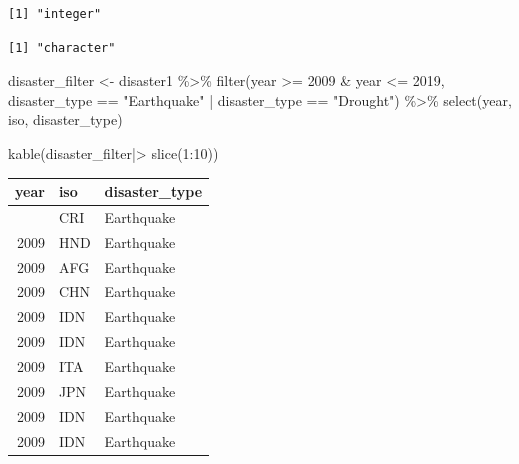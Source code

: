 \documentclass[
  letterpaper,
  DIV=11,
  numbers=noendperiod]{scrartcl}
\newenvironment{Shaded}{\begin{snugshade}}{\end{snugshade}}
\newcommand{\DecValTok}[1]{\textcolor[rgb]{0.68,0.00,0.00}{#1}}
\newcommand{\FunctionTok}[1]{\textcolor[rgb]{0.28,0.35,0.67}{#1}}
\newcommand{\NormalTok}[1]{\textcolor[rgb]{0.00,0.23,0.31}{#1}}
\newcommand{\OtherTok}[1]{\textcolor[rgb]{0.00,0.23,0.31}{#1}}
\newcommand{\SpecialCharTok}[1]{\textcolor[rgb]{0.37,0.37,0.37}{#1}}
\newcommand{\StringTok}[1]{\textcolor[rgb]{0.13,0.47,0.30}{#1}}
\newcounter{none} %
\begin{document}
\begin{verbatim}
[1] "integer"
\end{verbatim}

\begin{Shaded}
\end{Shaded}

\begin{verbatim}
[1] "character"
\end{verbatim}

\begin{Shaded}
\begin{Highlighting}[]
\NormalTok{disaster\_filter }\OtherTok{\textless{}{-}}\NormalTok{ disaster1 }\SpecialCharTok{\%\textgreater{}\%} \FunctionTok{filter}\NormalTok{(year }\SpecialCharTok{\textgreater{}=} \DecValTok{2009} \SpecialCharTok{\&}\NormalTok{ year }\SpecialCharTok{\textless{}=} \DecValTok{2019}\NormalTok{,}
\NormalTok{                                        disaster\_type }\SpecialCharTok{==} \StringTok{"Earthquake"} \SpecialCharTok{|} 
\NormalTok{                                            disaster\_type }\SpecialCharTok{==} \StringTok{"Drought"}\NormalTok{) }\SpecialCharTok{\%\textgreater{}\%} 
                    \FunctionTok{select}\NormalTok{(year, iso, disaster\_type)}

\FunctionTok{kable}\NormalTok{(disaster\_filter}\SpecialCharTok{|\textgreater{}} \FunctionTok{slice}\NormalTok{(}\DecValTok{1}\SpecialCharTok{:}\DecValTok{10}\NormalTok{))                                }
\end{Highlighting}
\end{Shaded}

{\def\LTcaptype{none} %
\begin{longtable}[]{@{}rll@{}}
\toprule\noalign{}
year & iso & disaster\_type \\
\midrule\noalign{}
\endhead
\bottomrule\noalign{}
\endlastfoot
2009 & CRI & Earthquake \\
2009 & HND & Earthquake \\
2009 & AFG & Earthquake \\
2009 & CHN & Earthquake \\
2009 & IDN & Earthquake \\
2009 & IDN & Earthquake \\
2009 & ITA & Earthquake \\
2009 & JPN & Earthquake \\
2009 & IDN & Earthquake \\
2009 & IDN & Earthquake \\
\end{longtable}
}
\end{document}
